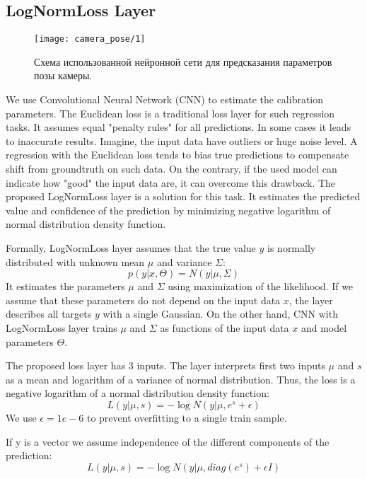 \subsection{LogNormLoss Layer}
\label{sec:lognormloss}


\begin{figure*}[!t]
	\centering
	\texttt{[image: camera\_pose/1]}
	\caption{Схема использованной нейронной сети для предсказания параметров позы камеры.}
	\label{fig:net}
\end{figure*}


We use Convolutional Neural Network (CNN) to estimate the calibration parameters. The Euclidean loss is a traditional loss layer for such regression tasks. It assumes equal "penalty rules" for all predictions. In some cases it leads to inaccurate results. Imagine, the input data have outliers or huge noise level. A regression with the Euclidean loss tends to bias true predictions to compensate shift from groundtruth on such data. On the contrary, if the used model can indicate how "good" the input data are, it can overcome this drawback. The proposed LogNormLoss layer is a solution for this task. It estimates the predicted value and confidence of the prediction by minimizing negative logarithm of normal distribution density function.

Formally, LogNormLoss layer assumes that the true value $y$ is normally distributed with unknown mean $\mu$ and variance $\Sigma$:
\begin{equation}
p(y|x, \Theta) = N(y|\mu, \Sigma)
\end{equation}
It estimates the parameters $\mu$ and $\Sigma$ using maximization of the likelihood. If we assume that these parameters do not depend on the input data $x$, the layer describes all targets $y$ with a single Gaussian. On the other hand, CNN with LogNormLoss layer trains $\mu$ and $\Sigma$ as functions of the input data $x$ and model parameters $\Theta$.

The proposed loss layer has 3 inputs. The layer interprets first two inputs $\mu$ and $s$ as a mean and logarithm of a variance of normal distribution. Thus, the loss is a negative logarithm of a normal distribution density function:
\begin{equation}
L(y |\mu, s) = -\log N(y|\mu, e^{s} + \epsilon)
\end{equation}
We use $\epsilon = 1e-6$ to prevent overfitting to a single train sample.

If y is a vector we assume independence of the different components of the prediction:
\begin{equation}
L(y | \mu, s) = -\log N(y|\mu, diag\left(e^{s}\right) + \epsilon I)  \label{eq:norm}
\end{equation}

